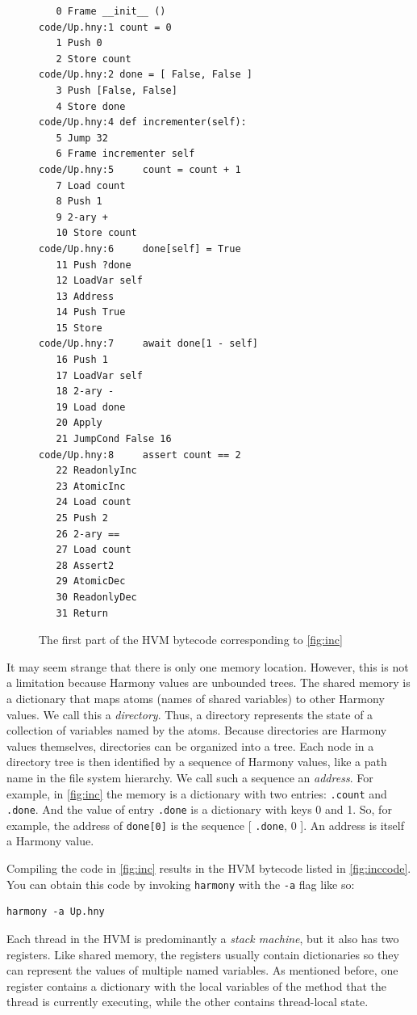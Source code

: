 \documentclass{report}
\newenvironment{code}{
\tcolorbox
}{
\endtcolorbox
}
\begin{document}
\begin{figure}
\begin{code}
\begin{verbatim}
   0 Frame __init__ ()
code/Up.hny:1 count = 0
   1 Push 0
   2 Store count
code/Up.hny:2 done = [ False, False ]
   3 Push [False, False]
   4 Store done
code/Up.hny:4 def incrementer(self):
   5 Jump 32
   6 Frame incrementer self
code/Up.hny:5     count = count + 1
   7 Load count
   8 Push 1
   9 2-ary +
   10 Store count
code/Up.hny:6     done[self] = True
   11 Push ?done
   12 LoadVar self
   13 Address
   14 Push True
   15 Store
code/Up.hny:7     await done[1 - self]
   16 Push 1
   17 LoadVar self
   18 2-ary -
   19 Load done
   20 Apply
   21 JumpCond False 16
code/Up.hny:8     assert count == 2
   22 ReadonlyInc
   23 AtomicInc
   24 Load count
   25 Push 2
   26 2-ary ==
   27 Load count
   28 Assert2
   29 AtomicDec
   30 ReadonlyDec
   31 Return
\end{verbatim}
\end{code}
\caption{The first part of the HVM bytecode corresponding to \autoref{fig:inc}}
\label{fig:inccode}
\end{figure}

It may seem strange that there is only one memory location.
However, this is not a limitation because Harmony values are unbounded trees.
The shared memory is a dictionary that maps atoms (names of shared
variables) to other Harmony values.
We call this a \emph{directory}.
%
Thus, a directory represents the state of a collection of variables named
by the atoms.
%
Because directories are Harmony values themselves,
directories can be organized into a tree.
Each node in a directory tree is then identified
by a sequence of Harmony values, like a path name in the file system
hierarchy.  We call such a sequence an \emph{address}.
%
For example, in \autoref{fig:inc} the memory is a dictionary with two
entries: \texttt{.count} and \texttt{.done}.  And the value of entry
\texttt{.done} is a dictionary with keys 0 and 1.
So, for example, the address of \texttt{done[0]} is the sequence
[ \texttt{.done}, 0 ].
An address is itself a Harmony value.

%

Compiling the code in \autoref{fig:inc} results in the HVM bytecode
listed in \autoref{fig:inccode}.
You can obtain this code by invoking \texttt{harmony} with the \texttt{-a} flag
like so:
\begin{code}
\begin{verbatim}
harmony -a Up.hny
\end{verbatim}
\end{code}
Each thread in the HVM is predominantly a \emph{stack machine},
%
but it also has two registers.
Like shared memory, the registers usually contain dictionaries so they
can represent the values of multiple named variables.
As mentioned before, one register contains a dictionary with the local
variables of the method that the thread is currently executing,
while the other contains thread-local state.
\end{document}
